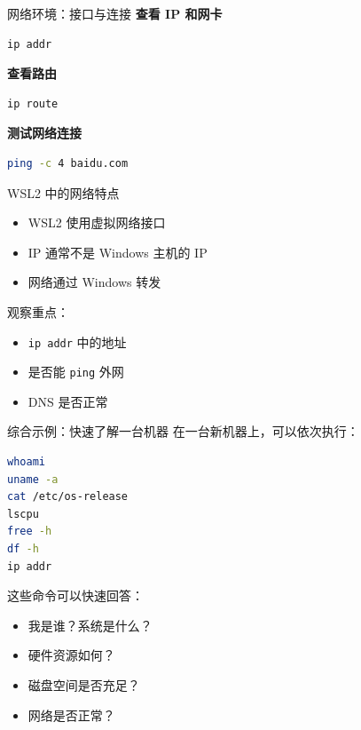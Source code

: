 \documentclass[aspectratio=169]{beamer}
\begin{document}
\begin{frame}[fragile]{网络环境：接口与连接}
\textbf{查看 IP 和网卡}
\begin{lstlisting}[language=bash]
ip addr
\end{lstlisting}

\textbf{查看路由}
\begin{lstlisting}[language=bash]
ip route
\end{lstlisting}

\textbf{测试网络连接}
\begin{lstlisting}[language=bash]
ping -c 4 baidu.com
\end{lstlisting}
\end{frame}

\begin{frame}{WSL2 中的网络特点}
\begin{itemize}
  \item WSL2 使用虚拟网络接口
  \item IP 通常不是 Windows 主机的 IP
  \item 网络通过 Windows 转发
\end{itemize}

\vspace{0.8em}
观察重点：
\begin{itemize}
  \item \texttt{ip addr} 中的地址
  \item 是否能 \texttt{ping} 外网
  \item DNS 是否正常
\end{itemize}
\end{frame}

\begin{frame}[fragile]{综合示例：快速了解一台机器}
在一台新机器上，可以依次执行：

\begin{lstlisting}[language=bash]
whoami
uname -a
cat /etc/os-release
lscpu
free -h
df -h
ip addr
\end{lstlisting}

\vspace{0.5em}
这些命令可以快速回答：
\begin{itemize}
  \item 我是谁？系统是什么？
  \item 硬件资源如何？
  \item 磁盘空间是否充足？
  \item 网络是否正常？
\end{itemize}
\end{frame}
\end{document}
